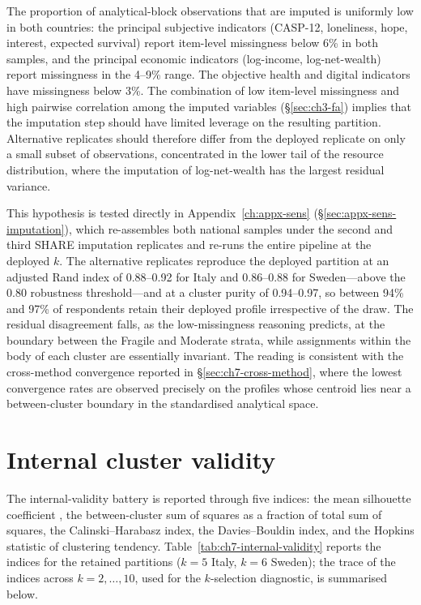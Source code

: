 The proportion of analytical-block observations that are imputed is uniformly low in both countries: the principal subjective indicators (CASP-12, loneliness, hope, interest, expected survival) report item-level missingness below 6\% in both samples, and the principal economic indicators (log-income, log-net-wealth) report missingness in the 4--9\% range. The objective health and digital indicators have missingness below 3\%. The combination of low item-level missingness and high pairwise correlation among the imputed variables (\S\ref{sec:ch3-fa}) implies that the imputation step should have limited leverage on the resulting partition. Alternative replicates should therefore differ from the deployed replicate on only a small subset of observations, concentrated in the lower tail of the resource distribution, where the imputation of log-net-wealth has the largest residual variance.

This hypothesis is tested directly in Appendix~\ref{ch:appx-sens} (\S\ref{sec:appx-sens-imputation}), which re-assembles both national samples under the second and third SHARE imputation replicates and re-runs the entire pipeline at the deployed $k$. The alternative replicates reproduce the deployed partition at an adjusted Rand index of 0.88--0.92 for Italy and 0.86--0.88 for Sweden---above the 0.80 robustness threshold---and at a cluster purity of 0.94--0.97, so between 94\% and 97\% of respondents retain their deployed profile irrespective of the draw. The residual disagreement falls, as the low-missingness reasoning predicts, at the boundary between the Fragile and Moderate strata, while assignments within the body of each cluster are essentially invariant. The reading is consistent with the cross-method convergence reported in \S\ref{sec:ch7-cross-method}, where the lowest convergence rates are observed precisely on the profiles whose centroid lies near a between-cluster boundary in the standardised analytical space.

\section{Internal cluster validity}
\label{sec:ch7-internal-validity}

The internal-validity battery is reported through five indices: the mean silhouette coefficient \citep{kaufman1990}, the between-cluster sum of squares as a fraction of total sum of squares, the Calinski--Harabasz index, the Davies--Bouldin index, and the Hopkins statistic of clustering tendency. Table~\ref{tab:ch7-internal-validity} reports the indices for the retained partitions ($k = 5$ Italy, $k = 6$ Sweden); the trace of the indices across $k = 2, \ldots, 10$, used for the $k$-selection diagnostic, is summarised below.

